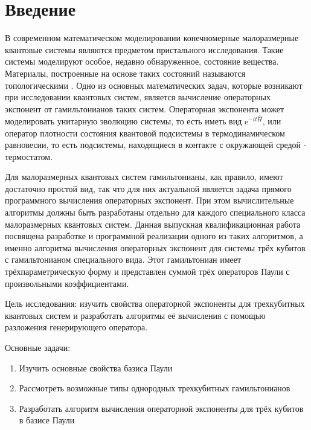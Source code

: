 \documentclass[a4paper]{report}
\begin{document}
\setcounter{page}{2}

\tableofcontents
\newpage



\section*{Введение}

В современном математическом моделировании конечномерные малоразмерные квантовые системы являются предметом пристального исследования. Такие системы моделируют особое, недавно обнаруженное, состояние вещества. Материалы, построенные на основе таких состояний называются топологическими \cite{Jeonghwan2023}. Одно из основных математических задач, которые возникают при исследовании квантовых систем, является вычисление операторных экспонент от гамильтонианов таких систем. Операторная экспонента может моделировать унитарную эволюцию системы, то есть иметь вид $\text{e}^{-it\hat{H}}$, или оператор плотности состояния квантовой подсистемы в термодинамическом равновесии, то есть подсистемы, находящиеся в контакте с окружающей средой - термостатом.

Для малоразмерных квантовых систем гамильтонианы, как правило, имеют достаточно простой вид, так что для них актуальной является задача прямого программного вычисления операторных экспонент. При этом вычислительные алгоритмы должны быть разработаны отдельно для каждого специального класса малоразмерных квантовых систем. Данная выпускная квалификационная работа посвящена разработке и программной реализации одного из таких алгоритмов, а именно алгоритма вычисления операторных экспонент для системы трёх кубитов с гамильтонианом специального вида. Этот гамильтониан имеет трёхпараметрическую форму и представлен суммой трёх операторов Паули с произвольными коэффициентами.

Цель исследования: изучить свойства операторной экспоненты для трехкубитных квантовых систем и разработать алгоритмы её вычисления с помощью разложения генерирующего оператора.

Основные задачи:
\begin{enumerate}
    \item{Изучить основные свойства базиса Паули}
    \item{Рассмотреть возможные типы однородных трехкубитных гамильтонианов }
    \item{Разработать алгоритм вычисления операторной экспоненты для трёх кубитов в базисе Паули}
\end{enumerate}
\end{document}

